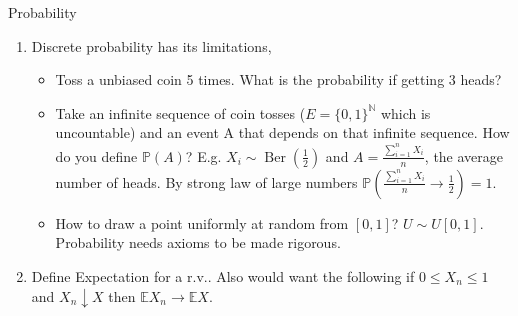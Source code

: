     Probability

    \begin{enumerate}
        \item Discrete probability has its limitations,
        \begin{itemize}
            \item Toss a unbiased coin 5 times. What is the probability if getting 3 heads?
            \item Take an infinite sequence of coin tosses ($E = \{0, 1\}^\mathbb{N}$ which is uncountable) and an event A that depends on that infinite sequence. How do you define $\mathbb{P}(A)$?
            E.g. $X_i \sim \operatorname{Ber}\left( \frac{1}{2} \right)$ and $A = \frac{\sum_{i=1}^{n} X_i}{n}$, the average number of heads.
            By strong law of large numbers $\mathbb{P}\left( \frac{\sum_{i=1}^{n} X_i}{n} \to \frac{1}{2} \right) = 1$.
            \item How to draw a point uniformly at random from $[0, 1]$? $U \sim U[0, 1]$.
            Probability needs axioms to be made rigorous.
        \end{itemize}
        \item Define Expectation for a r.v.. Also would want the following if $0 \leq X_n \leq 1$ and $X_n \downarrow X$ then $\mathbb{E} X_n \to \mathbb{E} X$.
    \end{enumerate}

    
    
    
    
    
    
    
